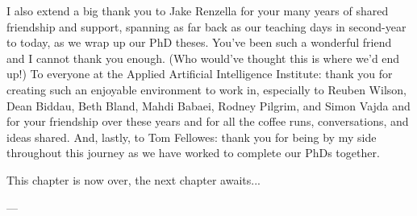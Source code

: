 I also extend a big thank you to Jake Renzella for your many years of shared friendship and support, spanning as far back as our teaching days in second-year to today, as we wrap up our PhD theses. You've been such a wonderful friend and I cannot thank you enough. (Who would've thought this is where we'd end up!)
To everyone at the Applied Artificial Intelligence Institute: thank you for creating such an enjoyable environment to work in, especially to Reuben Wilson, Dean Biddau, Beth Bland, Mahdi Babaei, Rodney Pilgrim, and Simon Vajda and for your friendship over these years and for all the coffee runs, conversations, and ideas shared.
And, lastly, to Tom Fellowes: thank you for being by my side throughout this journey as we have worked to complete our PhDs together.

\bigskip
\noindent
This chapter is now over, the next chapter awaits...

\bigskip
\noindent
\hspace{\fill}
\parbox[b]{0.4\linewidth}{
\raggedleft
\small
--- \theauthor{}\\
\thedate{}
}

